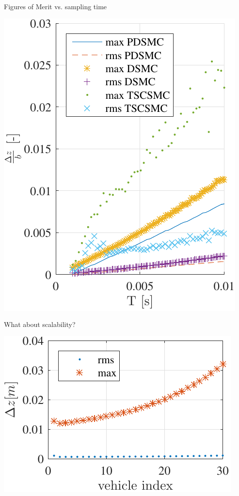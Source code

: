 \documentclass[]{beamer}
\begin{document}
\begin{frame}{Figures of Merit vs. sampling time}

\begin{center}
\includegraphics[height=0.8\paperheight]{error-z-vs-samplingtime.pdf}    

\end{center}\end{frame}

\begin{frame}{What about scalability?}
\centering
\begin{center}
\includegraphics[width=\columnwidth]{erroramplification-DSMC-100Hz-TIMESCALESEPARATION-turbulence=1-turbulenceonlyfirstUAS} 

\end{center}\end{frame}
\end{document}
